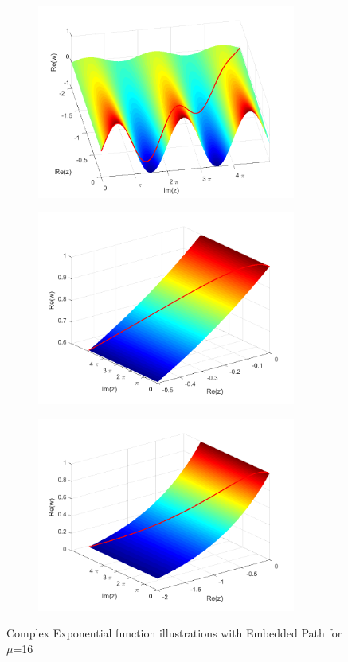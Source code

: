 \documentclass[a4paper,11pt]{article}
\begin{document}
\begin{figure}[!h]
\begin{subfigure}[c]{0.5\textwidth}
\includegraphics[width=8.5cm]{imag_musg12.png}
\end{subfigure}
\begin{subfigure}[c]{0.5\textwidth}
\includegraphics[width=8.5cm]{mod_musg11.png}
\end{subfigure}
\begin{subfigure}[c]{0.5\textwidth}
\includegraphics[width=8.5cm]{mod_musg12.png}
\end{subfigure}
\caption{Complex Exponential function illustrations with Embedded Path for $\mu$=16}
\label{embed2}
\end{figure}
\newpage
\end{document}
